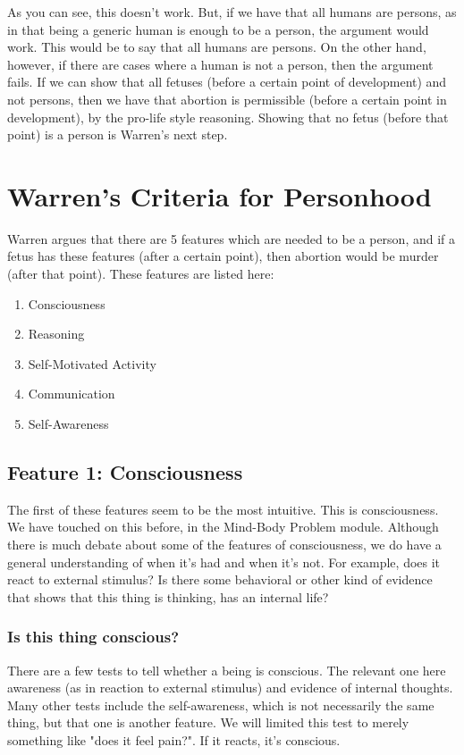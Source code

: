 As you can see, this doesn’t work. But, if we have that all humans are persons, as in that being a generic human is enough to be a person, the argument would work. This would be to say that all humans are persons. On the other hand, however, if there are cases where a human is not a person, then the argument fails. If we can show that all fetuses (before a certain point of development) and not persons, then we have that abortion is permissible (before a certain point in development), by the pro-life style reasoning. Showing that no fetus (before that point) is a person is Warren's next step.  

\section{Warren's Criteria for Personhood}
Warren argues that there are 5 features which are needed to be a person, and if a fetus has these features (after a certain point), then abortion would be murder (after that point). These features are listed here:

\begin{enumerate}
\item Consciousness 	
\item Reasoning
\item Self-Motivated Activity 
\item Communication
\item Self-Awareness
\end{enumerate}

\subsection{Feature 1: Consciousness}

The first of these features seem to be the most intuitive. This is consciousness. We have touched on this before, in the Mind-Body Problem module. Although there is much debate about some of the features of consciousness, we do have a general understanding of when it's had and when it's not. For example, does it react to external stimulus? Is there some behavioral or other kind of evidence that shows that this thing is thinking, has an internal life? 

\subsubsection{Is this thing conscious?}

There are a few tests to tell whether a being is conscious. The relevant one here awareness (as in reaction to external stimulus) and evidence of internal thoughts. Many other tests include the self-awareness, which is not necessarily the same thing, but that one is another feature. We will limited this test to merely something like "does it feel pain?". If it reacts, it's conscious.

